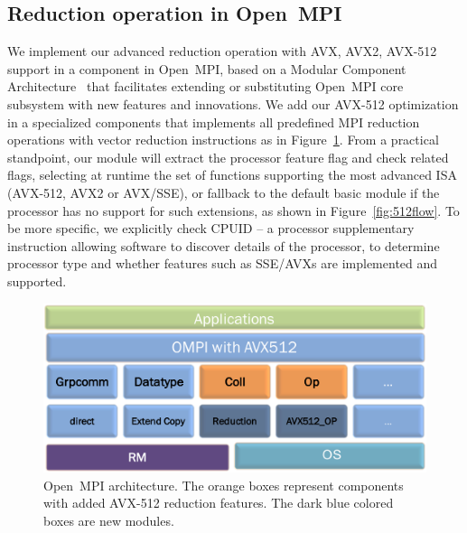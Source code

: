\documentclass[sigconf]{acmart}
\newcommand{\ompi}[0]{Open~MPI\xspace}
\begin{document}
\subsection{Reduction operation in \ompi}
We implement our advanced reduction operation with AVX, AVX2, AVX-512
support in a component in \ompi, based on a Modular Component
Architecture~\cite{dong_prrte} that facilitates extending or
substituting \ompi core subsystem with new features and innovations.
We add our AVX-512 optimization in a specialized components that
implements all predefined MPI reduction operations with vector
reduction instructions as in Figure~\ref{fig:avx_mca}. From a
practical standpoint, our module will extract the processor
feature flag and check related flags, selecting at runtime the set of
functions supporting the most advanced ISA (AVX-512, AVX2 or AVX/SSE),
or fallback to the default basic module if the processor has no
support for such extensions, as shown in Figure~\ref{fig:512flow}.
%
To be more specific, we explicitly check CPUID -- a processor
supplementary instruction allowing software to discover details of the
processor, to determine processor type and whether features such as
SSE/AVXs are implemented and supported.

\begin{figure}[h]
    \centering
    \includegraphics[width=\linewidth]{avx-mca.pdf}
    \caption{\ompi architecture. The orange boxes represent components with added AVX-512 reduction features. The dark blue colored boxes are new modules.}
    \label{fig:avx_mca}
\end{figure}
\end{document}
